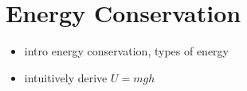 \chapter{Energy Conservation}

\begin{itemize}
	\item intro energy conservation, types of energy
	
	\item intuitively derive $U=mgh$
\end{itemize}

